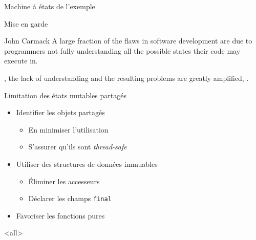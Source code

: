 \begin{frame}{Machine à états de l'exemple}
\begin{center}
\begin{tikzpicture}
   \end{tikzpicture}
\end{center}
\end{frame}

\begin{frame}{Mise en garde}
  \begin{shadequote}{John Carmack}
    A large fraction of the flaws in software development are due to programmers not fully understanding all the possible states their code may execute in.

    , the lack of understanding and the resulting problems are greatly amplified, .
  \end{shadequote}

\begin{alertblock}{Limitation des états mutables partagés}
\begin{itemize}
\item Identifier les objets partagés
\begin{itemize}
\item En minimiser l'utilisation
\item S'assurer qu'ils sont \textit{thread-safe}
\end{itemize}
\item Utiliser des structures de données immuables
\begin{itemize}
\item Éliminer les accesseurs
\item Déclarer les champs \lstinline{final}
\end{itemize}
\item Favoriser les fonctions pures
\end{itemize}
\end{alertblock}        

\end{frame}


\mode<all>


